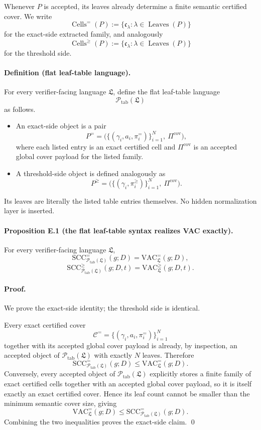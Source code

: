 Whenever $P$ is accepted, its leaves already determine a finite semantic certified cover. We write
\[
\operatorname{Cells}^{=}(P)
:=
\{\mathfrak c_\lambda:\lambda\in\operatorname{Leaves}(P)\}
\]
for the exact-side extracted family, and analogously
\[
\operatorname{Cells}^{\ge}(P)
:=
\{\mathfrak c_\lambda:\lambda\in\operatorname{Leaves}(P)\}
\]
for the threshold side.

\paragraph{Definition (flat leaf-table language).}
For every verifier-facing language $\mathfrak L$, define the flat leaf-table language
\[
\mathcal P_{\mathrm{tab}}(\mathfrak L)
\]
as follows.
\begin{itemize}
    \item An exact-side object is a pair
    \[
    P^{=}
    =
    \bigl(\{(\gamma_i,a_i,\pi_i^{=})\}_{i=1}^N,\ \Pi^{\mathrm{cov}}\bigr),
    \]
    where each listed entry is an exact certified cell and $\Pi^{\mathrm{cov}}$ is an accepted global cover payload for the listed family.
    \item A threshold-side object is defined analogously as
    \[
    P^{\ge}
    =
    \bigl(\{(\gamma_i,\pi_i^{\ge})\}_{i=1}^N,\ \Pi^{\mathrm{cov}}\bigr).
    \]
\end{itemize}
Its leaves are literally the listed table entries themselves. No hidden normalization layer is inserted.

\paragraph{Proposition E.1 (the flat leaf-table syntax realizes VAC exactly).}
For every verifier-facing language $\mathfrak L$,
\[
\mathrm{SCC}^{=}_{\mathcal P_{\mathrm{tab}}(\mathfrak L)}(g;D)
=
\mathrm{VAC}^{=}_{\mathfrak L}(g;D),
\]
\[
\mathrm{SCC}^{\ge}_{\mathcal P_{\mathrm{tab}}(\mathfrak L)}(g;D,t)
=
\mathrm{VAC}^{\ge}_{\mathfrak L}(g;D,t).
\]

\paragraph{Proof.}
We prove the exact-side identity; the threshold side is identical.

Every exact certified cover
\[
\mathcal C^{=}
=
\{(\gamma_i,a_i,\pi_i^{=})\}_{i=1}^N
\]
together with its accepted global cover payload is already, by inspection, an accepted object of $\mathcal P_{\mathrm{tab}}(\mathfrak L)$ with exactly $N$ leaves. Therefore
\[
\mathrm{SCC}^{=}_{\mathcal P_{\mathrm{tab}}(\mathfrak L)}(g;D)
\le
\mathrm{VAC}^{=}_{\mathfrak L}(g;D).
\]
Conversely, every accepted object of $\mathcal P_{\mathrm{tab}}(\mathfrak L)$ explicitly stores a finite family of exact certified cells together with an accepted global cover payload, so it is itself exactly an exact certified cover. Hence its leaf count cannot be smaller than the minimum semantic cover size, giving
\[
\mathrm{VAC}^{=}_{\mathfrak L}(g;D)
\le
\mathrm{SCC}^{=}_{\mathcal P_{\mathrm{tab}}(\mathfrak L)}(g;D).
\]
Combining the two inequalities proves the exact-side claim. \qed

